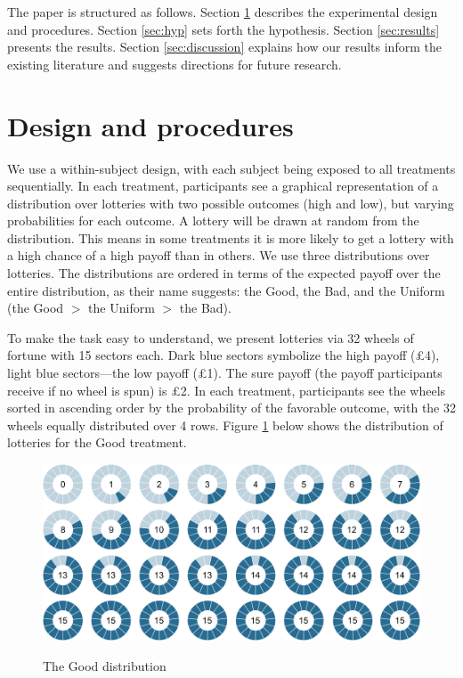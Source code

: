 The paper is structured as follows.
Section \ref{sec:proced} describes the experimental design and procedures.
Section \ref{sec:hyp} sets forth the hypothesis.
Section \ref{sec:results} presents the results.
Section \ref{sec:discussion} explains how our results inform the existing literature and suggests directions for future research.


\section{Design and procedures}\label{sec:proced}
We use a within-subject design, with each subject being exposed to all treatments sequentially.
In each treatment, participants see a graphical representation of a distribution over lotteries with two possible outcomes (high and low), but varying probabilities for each outcome.
A lottery will be drawn at random from the distribution.
This means in some treatments it is more likely to get a lottery with a high chance of a high payoff than in others.
We use three distributions over lotteries.
The distributions are ordered in terms of the expected payoff over the entire distribution, as their name suggests: the Good, the Bad, and the Uniform (the Good $>$ the Uniform $>$ the Bad).

To make the task easy to understand, we present lotteries via 32 wheels of fortune with 15 sectors each.
Dark blue sectors symbolize the high payoff (\pounds4), light blue sectors---the low payoff (\pounds1).
The sure payoff (the payoff participants receive if no wheel is spun) is \pounds2.
In each treatment, participants see the wheels sorted in ascending order by the probability of the favorable outcome, with the 32 wheels equally distributed over 4 rows.
Figure \ref{fig:TheGood} below shows the distribution of lotteries for the Good treatment.

\begin{figure}[h!]
  \centering
 {\includegraphics[width=\linewidth]{Fig1_Left_15.pdf}}
  \caption{The Good distribution}
  \label{fig:TheGood}
\end{figure}

